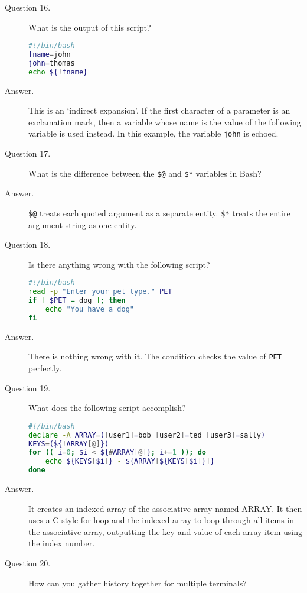 \documentclass{article}
\begin{document}
\begin{description}
	\item[Question 16.]
		What is the output of this script?

		\begin{lstlisting}[language=bash]
#!/bin/bash
fname=john
john=thomas
echo ${!fname}
		\end{lstlisting}

	\item[Answer.]
		This is an `indirect expansion'. If the first character of a parameter is an exclamation mark, then a variable whose name is the value of the following variable is used instead. In this example, the variable \verb`john` is echoed.

	\item[Question 17.]
		What is the difference between the \verb`$@` and \verb`$*` variables in Bash?

	\item[Answer.]
		\verb`$@` treats each quoted argument as a separate entity. \verb`$*` treats the entire argument string as one entity.

	\item[Question 18.]
		Is there anything wrong with the following script?

		\begin{lstlisting}[language=bash]
#!/bin/bash
read -p "Enter your pet type." PET
if [ $PET = dog ]; then
	echo "You have a dog"
fi
		\end{lstlisting}

	\item[Answer.]
		There is nothing wrong with it. The condition checks the value of \verb`PET` perfectly.

	\item[Question 19.]
		What does the following script accomplish?

		\begin{lstlisting}[language=bash]
#!/bin/bash
declare -A ARRAY=([user1]=bob [user2]=ted [user3]=sally)
KEYS=(${!ARRAY[@]})
for (( i=0; $i < ${#ARRAY[@]}; i+=1 )); do
	echo ${KEYS[$i]} - ${ARRAY[${KEYS[$i]}]}
done
		\end{lstlisting}

	\item[Answer.]
		It creates an indexed array of the associative array named ARRAY. It then uses a C-style for loop and the indexed array to loop through all items in the associative array, outputting the key and value of each array item using the index number.

	\item[Question 20.]
		How can you gather history together for multiple terminals?


\end{description}
\end{document}
